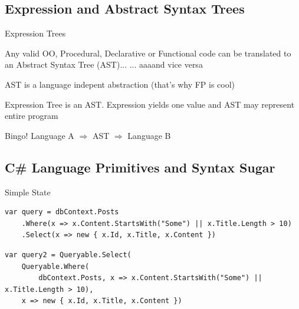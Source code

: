 \documentclass{bredelebeamer}
\begin{document}
\subsection{Expression and Abstract Syntax Trees}
\begin{frame}{Expression Trees}
    \begin{block}{Any valid OO, Procedural, Declarative or Functional code}
        can be translated to an Abstract Syntax Tree (AST)...
        \pause  ... aaaand vice versa
    \end{block}
    \pause
    \begin{block}{AST}
        is a language indepent abstraction \pause (that's why FP is cool)
    \end{block}
    \pause
    \begin{block}{Expression Tree}
        is an AST. Expression yields one value and AST may represent entire program
    \end{block}
    
    \begin{alertblock}{Bingo!}
        Language A $\Rightarrow$ AST $\Rightarrow$ Language B
    \end{alertblock}
\end{frame}
\subsection{C\# Language Primitives and Syntax Sugar}
\begin{frame}[fragile]{Simple State}
    \begin{lstlisting}
var query = dbContext.Posts
    .Where(x => x.Content.StartsWith("Some") || x.Title.Length > 10)
    .Select(x => new { x.Id, x.Title, x.Content })
    \end{lstlisting}
    \pause
    \begin{lstlisting}
var query2 = Queryable.Select(
    Queryable.Where(
        dbContext.Posts, x => x.Content.StartsWith("Some") || x.Title.Length > 10),
    x => new { x.Id, x.Title, x.Content })
    \end{lstlisting}
\end{frame}
\end{document}
